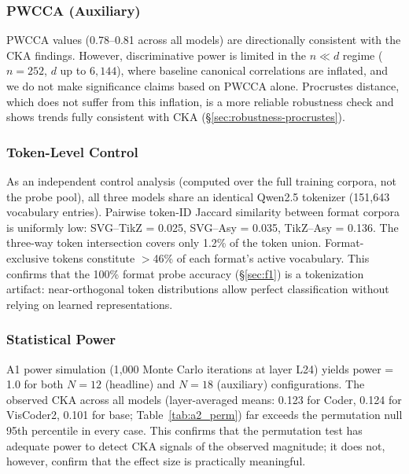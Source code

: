 \subsubsection{PWCCA (Auxiliary)}
\label{sec:robustness-pwcca}

PWCCA \cite{morcos2018pwcca} values (0.78--0.81 across all models) are directionally consistent with the CKA findings.
However, discriminative power is limited in the $n \ll d$ regime ($n{=}252$, $d$ up to $6{,}144$), where baseline canonical correlations are inflated, and we do not make significance claims based on PWCCA alone.
Procrustes distance, which does not suffer from this inflation, is a more reliable robustness check and shows trends fully consistent with CKA (\S\ref{sec:robustness-procrustes}).

\subsubsection{Token-Level Control}
\label{sec:robustness-token}

As an independent control analysis (computed over the full training corpora, not the probe pool), all three models share an identical Qwen2.5 tokenizer (151{,}643 vocabulary entries).
Pairwise token-ID Jaccard similarity between format corpora is uniformly low: SVG--TikZ = 0.025, SVG--Asy = 0.035, TikZ--Asy = 0.136.
The three-way token intersection covers only 1.2\% of the token union.
Format-exclusive tokens constitute $>$46\% of each format's active vocabulary.
This confirms that the 100\% format probe accuracy (\S\ref{sec:f1}) is a tokenization artifact: near-orthogonal token distributions allow perfect classification without relying on learned representations.

\subsubsection{Statistical Power}
\label{sec:robustness-power}

A1 power simulation (1{,}000 Monte Carlo iterations at layer L24) yields power = 1.0 for both $N{=}12$ (headline) and $N{=}18$ (auxiliary) configurations.
The observed CKA across all models (layer-averaged means: 0.123 for Coder, 0.124 for VisCoder2, 0.101 for base; Table~\ref{tab:a2_perm}) far exceeds the permutation null 95th percentile in every case.
This confirms that the permutation test has adequate power to detect CKA signals of the observed magnitude; it does not, however, confirm that the effect size is practically meaningful.


